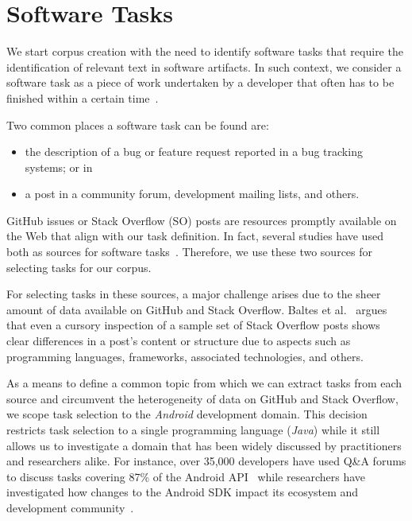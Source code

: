 \section{Software Tasks}
\label{cp4:corpus-tasks}


We start corpus creation with the need to identify software tasks that require
the identification of relevant text in software artifacts. 
In such context, we consider a software task as a piece of work undertaken by a developer that often has to be finished within a certain time~\cite{2004merriam}.


Two common places a software task can be found are:

\begin{itemize}
    \item the description of a bug or feature request reported in a bug tracking systems; or in
    \item a post in a community forum, development mailing lists, and others.
\end{itemize}

GitHub issues or Stack Overflow (SO) posts are resources promptly available on the Web that align with our task definition.
In fact, several studies have used both as sources for software tasks~\cite{Arya2019, baltes2019, nadi2020, Xu2017}. Therefore, we use these two sources for selecting tasks for our corpus.



For selecting tasks in these sources, a major challenge arises due to the sheer amount of data available on GitHub and Stack Overflow.
Baltes et al.~\cite{baltes2019} argues that even a cursory inspection of a sample set
of Stack Overflow posts shows clear differences in a post's content or structure due to aspects such as programming languages, frameworks, associated technologies, and others.

As a means to define a common topic from which we can extract tasks from each source
and circumvent the heterogeneity of data on GitHub and Stack Overflow, we scope task selection to the \textit{Android} development domain. This decision
restricts task selection to a single programming language (\textit{Java})
while it still allows us to investigate a domain that has been
widely discussed by practitioners and researchers alike.
For instance, over 35,000 developers have used Q\&A forums to discuss tasks covering 87\% of the Android API~\cite{parnin2012}
while researchers have investigated how changes to the Android SDK impact its ecosystem and development community~\cite{linares2014, bavota2014b, mcdonnell2013}.


